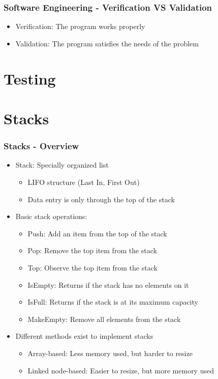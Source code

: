 \documentclass[c, aspectratio=169]{beamer}
\begin{document}
\begin{frame}\frametitle{Software Engineering - Verification VS Validation}
\begin{itemize}
\item Verification: The program works properly
\item Validation: The program satisfies the needs of the problem
\end{itemize}
\end{frame}

\section{Testing}

\section{Stacks}
\begin{frame}\frametitle{Stacks - Overview}
\begin{itemize}
\item Stack: Specially organized list
	\begin{itemize}
	\item LIFO structure (Last In, First Out)
	\item Data entry is only through the top of the stack
	\end{itemize}
\item Basic stack operations:
\begin{itemize}
\item Push: Add an item from the top of the stack
\item Pop: Remove the top item from the stack
\item Top: Observe the top item from the stack
\item IsEmpty: Returns if the stack has no elements on it
\item IsFull: Returns if the stack is at its maximum capacity
\item MakeEmpty: Remove all elements from the stack
\end{itemize}
\item Different methods exist to implement stacks
	\begin{itemize}
	\item Array-based: Less memory used, but harder to resize
	\item Linked node-based: Easier to resize, but more memory used
	\end{itemize}
\end{itemize}
\end{frame}
\end{document}
